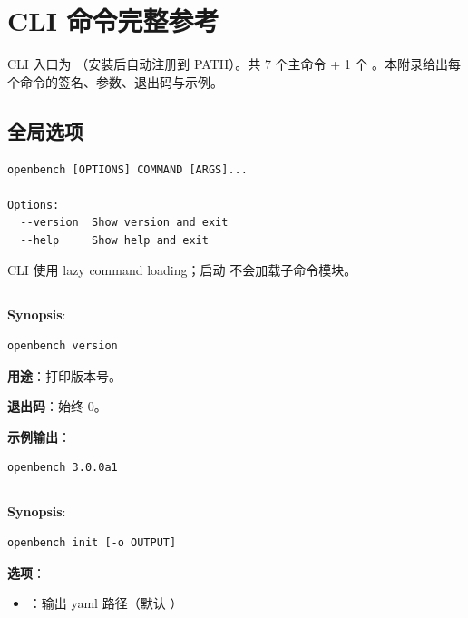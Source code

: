 
\chapter{CLI 命令完整参考}

\openbench{} CLI 入口为 （安装后自动注册到 PATH）。共 7 个主命令 + 1 个 。本附录给出每个命令的签名、参数、退出码与示例。

\section{全局选项}

\begin{verbatim}
openbench [OPTIONS] COMMAND [ARGS]...

Options:
  --version  Show version and exit
  --help     Show help and exit
\end{verbatim}

CLI 使用 lazy command loading；启动  不会加载子命令模块。

\section{}

\textbf{Synopsis}:

\begin{verbatim}
openbench version
\end{verbatim}

\textbf{用途}：打印版本号。

\textbf{退出码}：始终 0。

\textbf{示例输出}：

\begin{verbatim}
openbench 3.0.0a1
\end{verbatim}

\section{}

\textbf{Synopsis}:

\begin{verbatim}
openbench init [-o OUTPUT]
\end{verbatim}

\textbf{选项}：

\begin{itemize}
  \item {}：输出 yaml 路径（默认 ）
\end{itemize}

